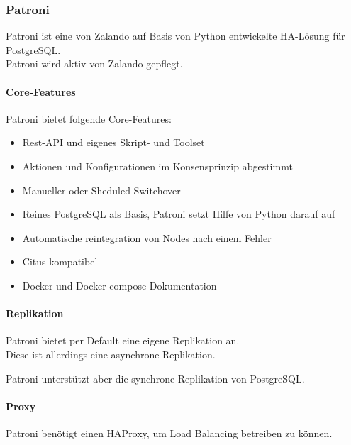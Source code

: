 
\clearpage
\begin{flushleft}
    \subsubsection{Patroni}
    Patroni ist eine von Zalando auf Basis von Python entwickelte HA-Lösung für \Gls{PostgreSQL}.\\
    Patroni wird aktiv von Zalando gepflegt.
\end{flushleft}
\begin{flushleft}
    \paragraph{Core-Features}
    Patroni bietet folgende Core-Features:
    \begin{itemize}
        \item Rest-API und eigenes Skript- und Toolset
        \item Aktionen und Konfigurationen im Konsensprinzip abgestimmt
        \item Manueller oder Sheduled Switchover
        \item Reines PostgreSQL als Basis, Patroni setzt Hilfe von Python darauf auf
        \item Automatische reintegration von Nodes nach einem Fehler
        \item Citus kompatibel
        \item Docker und Docker-compose Dokumentation
    \end{itemize}
\end{flushleft}
\begin{flushleft}
    \paragraph{Replikation}
    Patroni bietet per Default eine eigene Replikation an.\\
    Diese ist allerdings eine asynchrone Replikation.
\begin{flushleft}
    Patroni unterstützt aber die synchrone Replikation von \Gls{PostgreSQL}.
\end{flushleft}
\end{flushleft}
\begin{flushleft}
    \paragraph{Proxy}
    Patroni benötigt einen \Gls{HAProxy}, um Load Balancing betreiben zu können\cite{VYXTI7BS}.
\end{flushleft}
